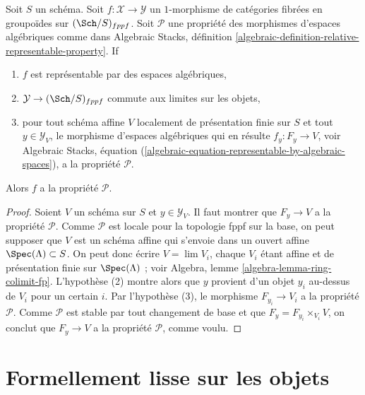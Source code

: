 \begin{lemma}
\label{lemma-check-property-limit-preserving}
Soit $S$ un schéma. Soit $f : \mathcal{X} \to \mathcal{Y}$ un $1$-morphisme
de catégories fibrées en groupoïdes sur $(\Sch/S)_{fppf}$. Soit $\mathcal{P}$
une propriété des morphismes d'espaces algébriques comme dans
Algebraic Stacks, définition
\ref{algebraic-definition-relative-representable-property}. If
\begin{enumerate}
\item $f$ est représentable par des espaces algébriques,
\item $\mathcal{Y} \to (\Sch/S)_{fppf}$ commute aux limites sur les objets,
\item pour tout schéma affine $V$ localement de présentation finie sur $S$ et
tout $y \in \mathcal{Y}_V$, le morphisme d'espaces algébriques qui en résulte
$f_y : F_y \to V$, voir Algebraic Stacks, équation
(\ref{algebraic-equation-representable-by-algebraic-spaces}),
a la propriété $\mathcal{P}$.
\end{enumerate}
Alors $f$ a la propriété $\mathcal{P}$.
\end{lemma}

\begin{proof}
Soient $V$ un schéma sur $S$ et $y \in \mathcal{Y}_V$. Il faut montrer
que $F_y \to V$ a la propriété $\mathcal{P}$. Comme $\mathcal{P}$ est
locale pour la topologie fppf sur la base, on peut supposer que $V$ est un schéma affine qui
s'envoie dans un ouvert affine $\Spec(\Lambda) \subset S$. On peut donc écrire
$V = \lim V_i$, chaque $V_i$ étant affine et de présentation finie sur
$\Spec(\Lambda)$ ; voir Algebra, lemme \ref{algebra-lemma-ring-colimit-fp}.
L'hypothèse (2) montre alors que $y$ provient d'un objet $y_i$ au-dessus de $V_i$ pour un certain $i$.
Par l'hypothèse (3), le morphisme $F_{y_i} \to V_i$ a la propriété $\mathcal{P}$.
Comme $\mathcal{P}$ est stable par tout changement de base et que
$F_y = F_{y_i} \times_{V_i} V$, on conclut que $F_y \to V$ a la propriété
$\mathcal{P}$, comme voulu.
\end{proof}



\section{Formellement lisse sur les objets}
\label{section-formally-smooth}


